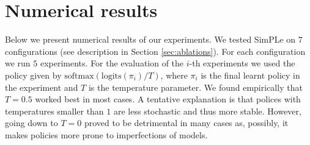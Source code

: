 
\onecolumn
\section{Numerical results}\label{numerical_results}
Below we present numerical results of our experiments. We tested SimPLe on $7$ configurations (see description in Section \ref{sec:ablations}). For each configuration we run $5$ experiments. For the evaluation of the $i$-th experiments we used the policy given by $\text{softmax}(\text{logits}(\pi_i)/T)$, where  $\pi_i$ is the final learnt policy in the experiment and $T$ is the temperature parameter. We found empirically that $T=0.5$ worked best in most cases. A tentative explanation is that polices with temperatures smaller than $1$ are less stochastic and thus more stable. However, going down to $T=0$ proved to be detrimental in many cases as, possibly, it makes policies more prone to imperfections of models. 

